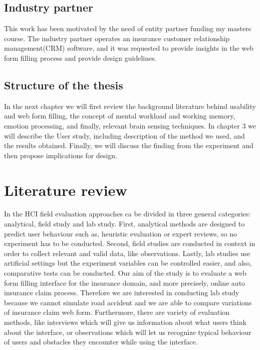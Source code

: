 \documentclass[a4paper]{report}
\begin{document}
	\section{Industry partner}
		This work has been motivated by the need of entity partner funding my masters course. The industry partner operates an insurance customer relationship management(CRM) software, and it was requested to provide insights in the web form filling process and provide design guidelines.	
	\section{Structure of the thesis}
		In the next chapter we will first review the background literature behind usability and web form filling, the concept of mental workload and working memory, emotion processing, and finally, relevant brain sensing techniques. In chapter 3 we will describe the User study, including description of the method we used, and the results obtained. Finally, we will discuss the finding from the experiment and then propose implications for design.
\chapter{Literature review}
	In the HCI field  evaluation approaches ca be divided in three general categories: analytical, field study and lab study\cite{rogers2007interaction}. First, analytical methods are designed to predict user behaviour such as, heuristic evaluation or expert reviews, so no experiment has to be conducted. Second, field studies are conducted in context in order to collect relevant and valid data, like observations. Lastly, lab studies use artificial settings but the experiment variables can be controlled easier, and also, comparative tests can be conducted. Our aim of the study is to evaluate a web form filling interface for the insurance domain, and more precisely, online auto insurance claim process. Therefore we are interested in conducting lab study because we cannot simulate road accident and we are able to compare variations of insurance claim web form. Furthermore, there are variety of evaluation methods, like interviews which will give us information about what users think about the interface, or observations which will let us recognize typical behaviour of users and obstacles they encounter while using the interface.\\
	
\end{document}
